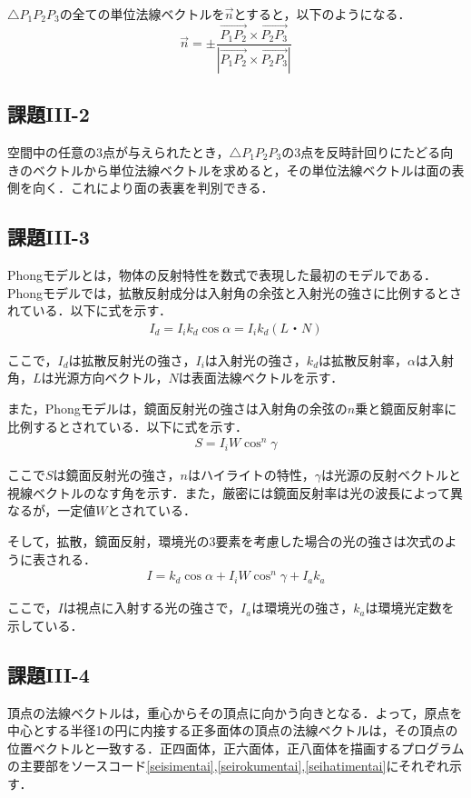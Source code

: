 \documentclass[]{jsarticle}
\begin{document}
$\triangle{P_1P_2P_3}$の全ての単位法線ベクトルを$\overrightarrow{n}$とすると，以下のようになる．
$$
\overrightarrow{n} = \pm\frac{\overrightarrow{P_1 P_2}\times\overrightarrow{P_2 P_3}}{|\overrightarrow{P_1 P_2}\times\overrightarrow{P_2 P_3}|}
$$
\subsection{課題III-2}
空間中の任意の3点が与えられたとき，$\triangle{P_1P_2P_3}$の3点を反時計回りにたどる向きのベクトルから単位法線ベクトルを求めると，その単位法線ベクトルは面の表側を向く．これにより面の表裏を判別できる．
\subsection{課題III-3}
Phongモデルとは，物体の反射特性を数式で表現した最初のモデルである．Phongモデルでは，拡散反射成分は入射角の余弦と入射光の強さに比例するとされている．以下に式を示す．
\begin{eqnarray*}
I_d = I_i k_d \cos\alpha = I_i k_d (L・N)
\end{eqnarray*}

ここで，$I_d$は拡散反射光の強さ，$I_i$は入射光の強さ，$k_d$は拡散反射率，$\alpha$は入射角，$L$は光源方向ベクトル，$N$は表面法線ベクトルを示す．

また，Phongモデルは，鏡面反射光の強さは入射角の余弦の$n$乗と鏡面反射率に比例するとされている．以下に式を示す．
\begin{eqnarray*}
S = I_i W \cos^n\gamma
\end{eqnarray*}

ここで$S$は鏡面反射光の強さ，$n$はハイライトの特性，$\gamma$は光源の反射ベクトルと視線ベクトルのなす角を示す．また，厳密には鏡面反射率は光の波長によって異なるが，一定値$W$とされている．

そして，拡散，鏡面反射，環境光の3要素を考慮した場合の光の強さは次式のように表される．
\begin{eqnarray*}
I = k_d \cos\alpha + I_i W \cos^n \gamma + I_a k_a
\end{eqnarray*}

ここで，$I$は視点に入射する光の強さで，$I_a$は環境光の強さ，$k_a$は環境光定数を示している．

\subsection{課題III-4}
頂点の法線ベクトルは，重心からその頂点に向かう向きとなる．よって，原点を中心とする半径1の円に内接する正多面体の頂点の法線ベクトルは，その頂点の位置ベクトルと一致する．正四面体，正六面体，正八面体を描画するプログラムの主要部をソースコード\ref{seisimentai},\ref{seirokumentai},\ref{seihatimentai}にそれぞれ示す．
\end{document}
